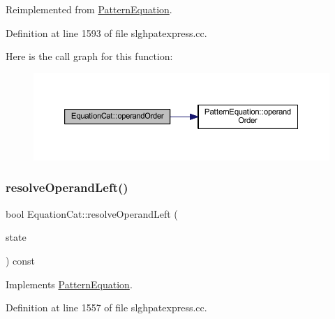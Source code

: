 Reimplemented from \mbox{\hyperlink{class_pattern_equation_a944d7114e5d5b6876352e555cc060829}{Pattern\+Equation}}.



Definition at line 1593 of file slghpatexpress.\+cc.

Here is the call graph for this function\+:
\nopagebreak
\begin{figure}[H]
\begin{center}
\leavevmode
\includegraphics[width=350pt]{class_equation_cat_a3504199664351bffd3aeb8b6e8246fec_cgraph}
\end{center}
\end{figure}
\mbox{\label{class_equation_cat_a1c2557c53605b96ab6888ea55d8f5964}} 
\subsubsection{\texorpdfstring{resolveOperandLeft()}{resolveOperandLeft()}}
{\footnotesize\ttfamily bool Equation\+Cat\+::resolve\+Operand\+Left (\begin{DoxyParamCaption}\item[{\mbox{\hyperlink{struct_operand_resolve}{Operand\+Resolve}} \&}]{state }\end{DoxyParamCaption}) const\hspace{0.3cm}{\ttfamily [virtual]}}



Implements \mbox{\hyperlink{class_pattern_equation_a16e885a945df91e3daf2dea6394ae6f2}{Pattern\+Equation}}.



Definition at line 1557 of file slghpatexpress.\+cc.

